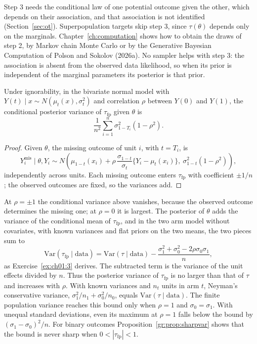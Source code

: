 Step 3 needs the conditional law of one potential outcome given the other, which depends on their association, and that association is not identified (Section~\ref{sec:ot}). Superpopulation targets skip step 3, since $\tau(\theta)$ depends only on the marginals. Chapter~\ref{ch:computation} shows how to obtain the draws of step 2, by Markov chain Monte Carlo or by the Generative Bayesian Computation of Polson and Sokolov (2026a). No sampler helps with step 3: the association is absent from the observed data likelihood, so when its prior is independent of the marginal parameters its posterior is that prior.

\begin{proposition}
Under ignorability, in the bivariate normal model with $Y(t) \mid x \sim N(\mu_t(x), \sigma_t^2)$ and correlation $\rho$ between $Y(0)$ and $Y(1)$, the conditional posterior variance of $\tau_{\mathrm{fp}}$ given $\theta$ is
\[
\frac{1}{n^2}\sum_{i=1}^n \sigma_{1 - T_i}^2(1 - \rho^2).
\]
\end{proposition}

\begin{proof}
Given $\theta$, the missing outcome of unit $i$, with $t = T_i$, is
\[
Y_i^{\mathrm{mis}} \mid \theta, Y_i \sim N\!\left(\mu_{1-t}(x_i) + \rho\,\frac{\sigma_{1-t}}{\sigma_t}\{Y_i - \mu_t(x_i)\},\ \sigma_{1-t}^2(1 - \rho^2)\right),
\]
independently across units. Each missing outcome enters $\tau_{\mathrm{fp}}$ with coefficient $\pm 1/n$; the observed outcomes are fixed, so the variances add.
\end{proof}

At $\rho = \pm 1$ the conditional variance above vanishes, because the observed outcome determines the missing one; at $\rho = 0$ it is largest. The posterior of $\theta$ adds the variance of the conditional mean of $\tau_{\mathrm{fp}}$, and in the two arm model without covariates, with known variances and flat priors on the two means, the two pieces sum to
\[
\mathrm{Var}(\tau_{\mathrm{fp}} \mid \text{data}) = \mathrm{Var}(\tau \mid \text{data}) - \frac{\sigma_1^2 + \sigma_0^2 - 2\rho\sigma_0\sigma_1}{n},
\]
as Exercise~\ref{ex:ch01:3} derives. The subtracted term is the variance of the unit effects divided by $n$. Thus the posterior variance of $\tau_{\mathrm{fp}}$ is no larger than that of $\tau$ and increases with $\rho$. With known variances and $n_t$ units in arm $t$, Neyman's conservative variance, $\sigma_1^2/n_1 + \sigma_0^2/n_0$, equals $\mathrm{Var}(\tau \mid \text{data})$. The finite population variance reaches this bound only when $\rho = 1$ and $\sigma_0 = \sigma_1$. With unequal standard deviations, even its maximum at $\rho = 1$ falls below the bound by $(\sigma_1-\sigma_0)^2/n$. For binary outcomes Proposition~\ref{gr:prop:sharpvar} shows that the bound is never sharp when $0 < |\tau_{\mathrm{fp}}| < 1$.

